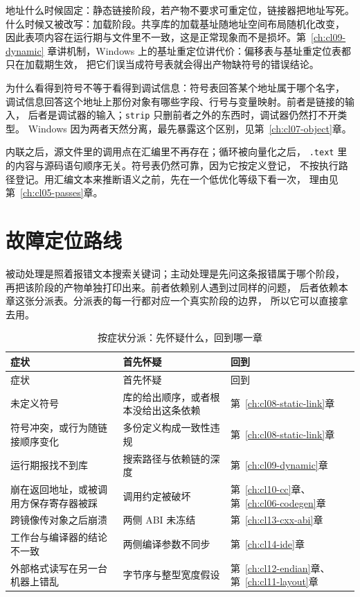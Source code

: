 \documentclass[12pt,a4paper,fontset=fandol]{ctexbook}
\newcommand{\Tool}[1]{\texttt{#1}}
\newcommand{\Sect}[1]{\texttt{.#1}}
\newcommand{\Mx}[1]{\textsf{#1}}
\newcommand{\Win}{\textsf{Windows}}
\begin{document}
地址什么时候固定：静态链接阶段，若产物不要求可重定位，链接器把地址写死。
什么时候又被改写：加载阶段。共享库的加载基址随地址空间布局随机化改变，
因此表项内容在运行期与文件里不一致，这是正常现象而不是损坏。第~\ref{ch:cl09-dynamic}
章讲机制，\Win{} 上的基址重定位讲代价：偏移表与基址重定位表都只在加载期生效，
把它们误当成符号表就会得出产物缺符号的错误结论。

为什么看得到符号不等于看得到调试信息：符号表回答某个地址属于哪个名字，
调试信息回答这个地址上那份对象有哪些字段、行号与变量映射。前者是链接的输入，
后者是调试器的输入；\Tool{strip} 只删前者之外的东西时，调试器仍然打不开类型。
\Win{} 因为两者天然分离，最先暴露这个区别，见第~\ref{ch:cl07-object}章。

\begin{note}[title={优化会让观察点变得不像源码}]
内联之后，源文件里的调用点在汇编里不再存在；循环被向量化之后，
\Sect{text} 里的内容与源码语句顺序无关。符号表仍然可靠，因为它按定义登记，
不按执行路径登记。用汇编文本来推断语义之前，先在一个低优化等级下看一次，
理由见第~\ref{ch:cl05-passes}章。
\end{note}

\section{故障定位路线}\label{sec:cl15-triage}

\begin{compare}[title={同一句报错的两种处理方式}]
被动处理是照着报错文本搜索关键词；主动处理是先问这条报错属于哪个阶段，
再把该阶段的产物单独打印出来。前者依赖别人遇到过同样的问题，
后者依赖本章这张分派表。分派表的每一行都对应一个真实阶段的边界，
所以它可以直接拿去用。
\end{compare}

\begin{longtable}{@{}>{\raggedright\arraybackslash}p{} >{\raggedright\arraybackslash}p{} >{\raggedright\arraybackslash}p{}@{}}
\caption{按症状分派：先怀疑什么，回到哪一章}\label{tab:cl15-triage}\\
\toprule
症状 & 首先怀疑 & 回到 \\
\midrule
\endfirsthead
\toprule
症状 & 首先怀疑 & 回到 \\
\midrule
\endhead
未定义符号 & 库的给出顺序，或者根本没给出这条依赖 &
第~\ref{ch:cl08-static-link}章 \\
符号冲突，或行为随链接顺序变化 & 多份定义构成一致性违规 &
第~\ref{ch:cl08-static-link}章 \\
运行期报找不到库 & 搜索路径与依赖链的深度 &
第~\ref{ch:cl09-dynamic}章 \\
崩在返回地址，或被调用方保存寄存器被踩 & 调用约定被破坏 &
第~\ref{ch:cl10-cc}章、第~\ref{ch:cl06-codegen}章 \\
跨镜像传对象之后崩溃 & 两侧 \Mx{ABI} 未冻结 &
第~\ref{ch:cl13-cxx-abi}章 \\
工作台与编译器的结论不一致 & 两侧编译参数不同步 &
第~\ref{ch:cl14-ide}章 \\
外部格式读写在另一台机器上错乱 & 字节序与整型宽度假设 &
第~\ref{ch:cl12-endian}章、第~\ref{ch:cl11-layout}章 \\
\bottomrule
\end{longtable}
\end{document}
